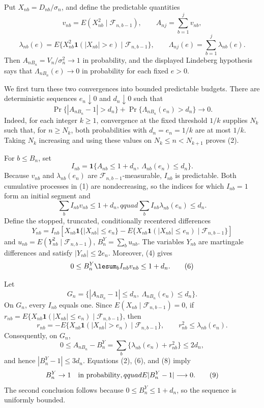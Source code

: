 Put \(X_{nb}=D_{nb}/\sigma_n\), and define the predictable quantities
\[
v_{nb}=E(X_{nb}^2\mid\mathcal F_{n,b-1}),\qquad
A_{nj}=\sum_{b=1}^jv_{nb},
\]
\[
\lambda_{nb}(e)=E\{X_{nb}^2\mathbf 1(|X_{nb}|>e)\mid\mathcal F_{n,b-1}\},
\qquad \Lambda_{nj}(e)=\sum_{b=1}^j\lambda_{nb}(e).
\tag{1}
\]
Then \(A_{nB_n}=V_n/\sigma_n^2\to1\) in probability, and the displayed Lindeberg hypothesis says that \(\Lambda_{nB_n}(e)\to0\) in probability for each fixed \(e>0\).

We first turn these two convergences into bounded predictable budgets. There are deterministic sequences \(e_n\downarrow0\) and \(d_n\downarrow0\) such that
\[
\Pr\{|A_{nB_n}-1|>d_n\}+\Pr\{\Lambda_{nB_n}(e_n)>d_n\}\longrightarrow0.
\tag{2}
\]
Indeed, for each integer \(k\ge1\), convergence at the fixed threshold \(1/k\) supplies \(N_k\) such that, for \(n\ge N_k\), both probabilities with \(d_n=e_n=1/k\) are at most \(1/k\). Taking \(N_k\) increasing and using these values on \(N_k\le n<N_{k+1}\) proves (2).

For \(b\le B_n\), set
\[
I_{nb}=\mathbf 1\{A_{nb}\le1+d_n,\ \Lambda_{nb}(e_n)\le d_n\}.
\tag{3}
\]
Because \(v_{nb}\) and \(\lambda_{nb}(e_n)\) are \(\mathcal F_{n,b-1}\)-measurable, \(I_{nb}\) is predictable. Both cumulative processes in (1) are nondecreasing, so the indices for which \(I_{nb}=1\) form an initial segment and
\[
\sum_b I_{nb}v_{nb}\le1+d_n,qquad
\sum_b I_{nb}\lambda_{nb}(e_n)\le d_n.
\tag{4}
\]
Define the stopped, truncated, conditionally recentered differences
\[
Y_{nb}=I_{nb}\left[X_{nb}\mathbf 1\{|X_{nb}|\le e_n\}
-E\{X_{nb}\mathbf 1(|X_{nb}|\le e_n)\mid\mathcal F_{n,b-1}\}\right]
\tag{5}
\]
and \(u_{nb}=E(Y_{nb}^2\mid\mathcal F_{n,b-1})\), \(B_n^Y=\sum_bu_{nb}\). The variables \(Y_{nb}\) are martingale differences and satisfy \(|Y_{nb}|\le2e_n\). Moreover, (4) gives
\[
0\le B_n^Y\lesum_bI_{nb}v_{nb}\le1+d_n.
\tag{6}
\]

Let
\[
G_n=\{|A_{nB_n}-1|\le d_n,\ \Lambda_{nB_n}(e_n)\le d_n\}.
\]
On \(G_n\), every \(I_{nb}\) equals one. Since \(E(X_{nb}\mid\mathcal F_{n,b-1})=0\), if
\(r_{nb}=E\{X_{nb}\mathbf 1(|X_{nb}|\le e_n)\mid\mathcal F_{n,b-1}\}\), then
\[
r_{nb}=-E\{X_{nb}\mathbf 1(|X_{nb}|>e_n)\mid\mathcal F_{n,b-1}\},
\qquad r_{nb}^2\le\lambda_{nb}(e_n).
\tag{7}
\]
Consequently, on \(G_n\),
\[
0\le A_{nB_n}-B_n^Y
=\sum_b\{\lambda_{nb}(e_n)+r_{nb}^2\}
\le2d_n,
\tag{8}
\]
and hence \(|B_n^Y-1|\le3d_n\). Equations (2), (6), and (8) imply
\[
B_n^Y\to1\quad\hbox{in probability},qquad E|B_n^Y-1|\longrightarrow0.
\tag{9}
\]
The second conclusion follows because \(0\le B_n^Y\le1+d_n\), so the sequence is uniformly bounded.


